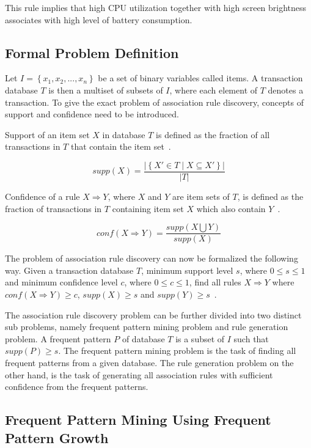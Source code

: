 This rule implies that high CPU utilization together with high screen brightness associates with high level of battery consumption.

\subsection{Formal Problem Definition}

Let $I = \left\{ x_1, x_2, ..., x_n \right\}$ be a set of binary variables called items. A transaction database $T$ is then a multiset of subsets of $I$, where each element of $T$ denotes a transaction. To give the exact problem of association rule discovery, concepts of support and confidence need to be introduced.

Support of an item set $X$ in database $T$ is defined as the fraction of all transactions in $T$ that contain the item set~\cite{Hipp:2000:AAR:360402.360421}.

\[ supp(X) = \dfrac{ \vert \left\{ X' \in T  \mid X \subseteq X'  \right\}  \vert }{ \vert T \vert  } \]

Confidence of a rule $X \Rightarrow Y$, where $X$ and $Y$ are item sets of $T$, is defined as the fraction of transactions in $T$ containing item set $X$ which also contain $Y$~\cite{Hipp:2000:AAR:360402.360421}.

\[conf( X \Rightarrow Y) = \dfrac{ supp( X \bigcup Y ) }{ supp(X) } \]

The problem of association rule discovery can now be formalized the following way. Given a transaction database $T$, minimum support level $s$, where $ 0 \leq s \leq 1 $ and minimum confidence level $c$, where $ 0 \leq c \leq 1 $, find all rules $X \Rightarrow Y$ where $conf( X \Rightarrow Y ) \geq c$, $supp(X) \geq s$ and $supp(Y) \geq s$~\cite{Hipp:2000:AAR:360402.360421}. 

The association rule discovery problem can be further divided into two distinct sub problems, namely frequent pattern mining problem and rule generation problem. A frequent pattern $P$ of database $T$ is a subset of $I$ such that $supp(P) \geq s$. The frequent pattern mining problem is the task of finding all frequent patterns from a given database. The rule generation problem on the other hand, is the task of generating all association rules with sufficient confidence from the frequent patterns. 

\subsection{Frequent Pattern Mining Using Frequent Pattern Growth}

